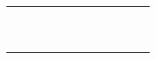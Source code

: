 \begin{table}[]
\begin{tabular}{lllllllllllll}
		&                  &   &   &                &               &                      &                      &                   &              &                     &                &                 \\
		&                  &   &   &                &               &                      &                      &                   &              &                     &                &                 \\
		&                  &   &   &                &               &                      &                      &                   &              &                     &                &                 \\
		&                  &   &   &                &               &                      &                      &                   &              &                     &                &                 \\
		&                  &   &   &                &               &                      &                      &                   &              &                     &                &                 \\
		&                  &   &   &                &               &                      &                      &                   &              &                     &                &                 \\
		&                  &   &   &                &               &                      &                      &                   &              &                     &                &                 \\
		&                  &   &   &                &               &                      &                      &                   &              &                     &                &                 \\
		&                  &   &   &                &               &                      &                      &                   &              &                     &                &                 \\
		&                  &   &   &                &               &                      &                      &                   &              &                     &                &                 \\
		&                  &   &   &                &               &                      &                      &                   &              &                     &                &                 \\

\end{tabular}
\end{table}
